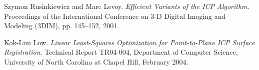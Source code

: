 \documentclass[10pt,twocolumn,letterpaper]{article}
\begin{document}
{\small


}

\begin{thebibliography}{99}
Szymon Rusinkiewicz and Marc Levoy.
\emph{Efficient Variants of the ICP Algorithm}.
Proceedings of the International Conference on 3-D Digital Imaging and
Modeling (3DIM), pp. 145–152, 2001.

Kok-Lim Low.
\emph{Linear Least-Squares Optimization for
Point-to-Plane ICP Surface Registration}.
Technical Report TR04-004, Department of Computer Science, University of North Carolina at Chapel Hill, February 2004.

\end{thebibliography}
\end{document}
